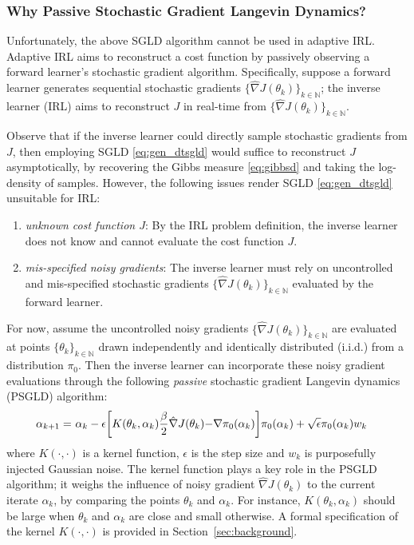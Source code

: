 \documentclass[journal,onecolumn]{IEEEtran}
\newcommand{\alk}{\alpha_k}
\newcommand{\alkk}{\alpha_{k+1}}
\newcommand{\thk}{\theta_k}
\newcommand{\step}{\epsilon}
\newcommand{\grad}{\nabla}
\newcommand{\gradn}{\hat{\nabla}}
\newcommand{\rew}{J}
\newcommand{\idistr}{\ids_0}
\newcommand{\K}{K}
\newcommand{\N}{\mathbb{N}}
\newcommand{\ids}{\pi}
\begin{document}
\subsubsection{Why Passive Stochastic Gradient Langevin Dynamics?}
Unfortunately, the above SGLD algorithm cannot be used in adaptive  IRL.
Adaptive IRL aims to reconstruct a cost function by passively observing a forward learner's stochastic gradient algorithm. Specifically, suppose a forward learner generates sequential stochastic gradients $\{\gradn\rew(\thk)\}_{k\in\N}$; the inverse learner (IRL) aims to reconstruct $\rew$ in real-time from $\{\gradn\rew(\thk)\}_{k\in\N}$. 

Observe that if the inverse learner could directly sample stochastic gradients from $\rew$, then employing SGLD \eqref{eq:gen_dtsgld} would suffice to reconstruct $\rew$ asymptotically, by recovering the Gibbs measure \eqref{eq:gibbsd} and taking the log-density of samples. However, the following issues render SGLD \eqref{eq:gen_dtsgld} unsuitable for IRL:
\begin{enumerate}
    \item[-] \textit{unknown cost function $\rew$}: By the IRL problem definition, the inverse learner does not know and cannot evaluate the cost function $\rew$. 
    \item[-] \textit{mis-specified noisy gradients}: The inverse learner must rely on uncontrolled and mis-specified stochastic gradients $\{\gradn\rew(\thk)\}_{k\in\N}$ evaluated by the forward learner. 
\end{enumerate}
For now, assume the uncontrolled noisy gradients $\{\gradn\rew(\thk)\}_{k\in\N}$ are evaluated at points $\{\thk\}_{k\in\N}$ drawn independently and identically distributed (i.i.d.) from a distribution $\idistr$. Then the inverse learner can incorporate these noisy gradient evaluations through the following \textit{passive} stochastic gradient Langevin dynamics (PSGLD) algorithm:
\begin{align}
\begin{split}
\label{eq:dt_psgld}
    \alkk =\ &\alk - \step\biggl[\K(\thk,\alk) \frac{\beta}{2}\gradn \rew (\thk) \color{black}{-} \grad \idistr(\alk)\biggr]\idistr(\alk) + \sqrt{\step}\idistr(\alk) w_k
\end{split}
\end{align}
where  $K(\cdot,\cdot)$ is a kernel function, $\step$ is the step size and $w_k$ is purposefully injected Gaussian noise. The kernel function plays a key role in the PSGLD algorithm; it weighs the influence of noisy gradient $\gradn\rew(\thk)$ to the current iterate $\alk$, by comparing the points $\thk$ and $\alk$. For instance, $K(\thk,\alk)$ should be large when $\thk$ and $\alk$ are close and small otherwise. A formal specification of the kernel $K(\cdot,\cdot)$ is provided in Section~\ref{sec:background}.
\end{document}
